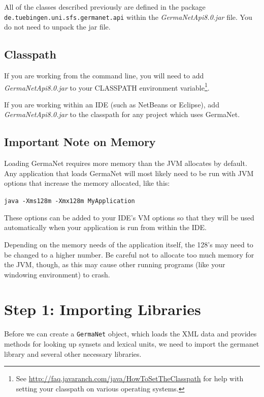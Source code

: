 \documentclass[12pt,a4paper,english,utf8]{report}
\begin{document}
All of the classes described previously are defined in the package \\ \texttt{de.tuebingen.uni.sfs.germanet.api} within the \emph{GermaNetApi8.0.jar} file. You do not need to unpack the jar file.



\subsection{Classpath}
If you are working from the command line, you will need to add \\ \emph{GermaNetApi8.0.jar} to your CLASSPATH environment variable\footnote{See \href{http://faq.javaranch.com/java/HowToSetTheClasspath}{http://faq.javaranch.com/java/HowToSetTheClasspath} for help with setting your classpath on various operating systems.}.

If you are working within an IDE (such as NetBeans or Eclipse), add \emph{GermaNetApi8.0.jar} to the classpath for any project which uses GermaNet.



\subsection{Important Note on Memory}
Loading GermaNet requires more memory than the JVM allocates by default. Any application that loads GermaNet will most likely need to be run with JVM options that increase the memory allocated, like this:

\texttt{java -Xms128m -Xmx128m MyApplication}

These options can be added to your IDE's VM options so that they will be used automatically when your application is run from within the IDE.

Depending on the memory needs of the application itself, the 128's may need to be changed to a higher number. Be careful not to allocate too much memory for the JVM, though, as this may cause other running programs (like your windowing environment) to crash.



\section{Step 1: Importing Libraries}
Before we can create a \texttt{GermaNet} object, which loads the XML data and provides methods for looking up synsets and lexical units, we need to import the germanet library and several other necessary libraries.
\end{document}
